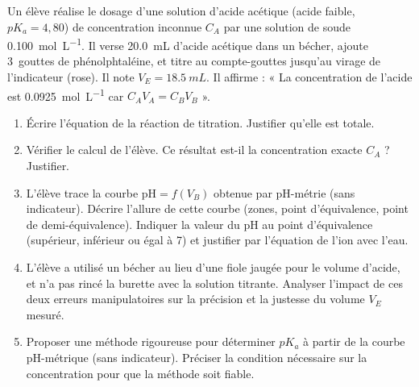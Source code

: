 \documentclass[11pt]{article}
\begin{document}
\begin{exercice}
Un élève réalise le dosage d'une solution d'acide acétique  (acide faible, $pK_a = 4,80$) de concentration inconnue $C_A$ par une solution de soude  \SI{0,100}{mol.L^{-1}}. Il verse \SI{20,0}{mL} d'acide acétique dans un bécher, ajoute \SI{3}{gouttes} de phénolphtaléine, et titre au compte-gouttes jusqu'au virage de l'indicateur (rose). Il note $V_E = \SI{18,5}{mL}$. Il affirme : « La concentration de l'acide est \SI{0,0925}{mol.L^{-1}} car $C_A V_A = C_B V_B$ ».
\begin{enumerate}
    \item Écrire l'équation de la réaction de titration. Justifier qu'elle est totale.
    \item Vérifier le calcul de l'élève. Ce résultat est-il la concentration exacte $C_A$ ? Justifier.
    \item L'élève trace la courbe $\text{pH} = f(V_B)$ obtenue par pH-métrie (sans indicateur). Décrire l'allure de cette courbe (zones, point d'équivalence, point de demi-équivalence). Indiquer la valeur du pH au point d'équivalence (supérieur, inférieur ou égal à 7) et justifier par l'équation de l'ion  avec l'eau.
    \item L'élève a utilisé un bécher au lieu d'une fiole jaugée pour le volume d'acide, et n'a pas rincé la burette avec la solution titrante. Analyser l'impact de ces deux erreurs manipulatoires sur la précision et la justesse du volume $V_E$ mesuré.
    \item Proposer une méthode rigoureuse pour déterminer $pK_a$ à partir de la courbe pH-métrique (sans indicateur). Préciser la condition nécessaire sur la concentration pour que la méthode soit fiable.
\end{enumerate}
\end{exercice}
\end{document}

